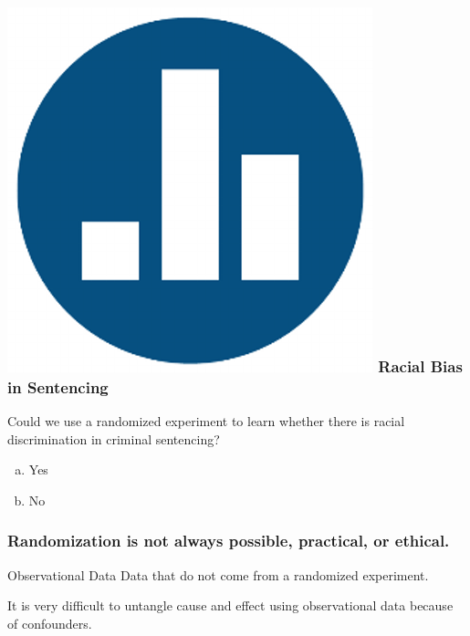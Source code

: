 \documentclass[handout]{beamer}
\begin{document}
\begin{frame}
\frametitle{\includegraphics[scale = 0.05]{./images/clicker} \hfill Racial Bias in Sentencing}
Could we use a randomized experiment to learn whether there is racial discrimination in criminal sentencing?

	\begin{enumerate}[(a)]
		\item Yes
		\item No
	\end{enumerate}
\end{frame}
\begin{frame}
\frametitle{Randomization is not always possible, practical, or ethical.}


\end{frame}





\begin{frame}

\begin{block}{Observational Data}
Data that do not come from a randomized experiment.

\end{block}
\vspace{2em}
\begin{alertblock}{It is very difficult to untangle cause and effect using observational data because of confounders.}
\end{alertblock}


\end{frame}
\end{document}
